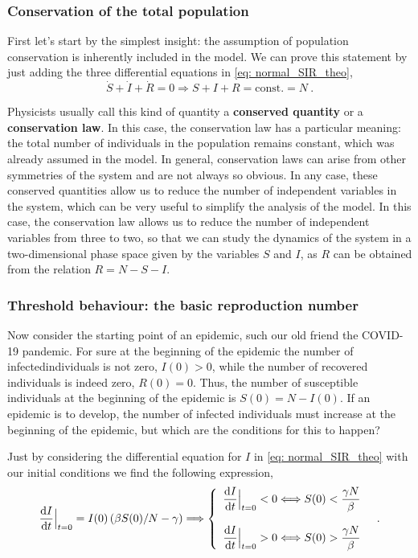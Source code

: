 \subsubsection*{Conservation of the total population}

First let's start by the simplest insight: the assumption of population
conservation is inherently included in the model. We can prove this statement
by just adding the three differential equations in \cref{eq: normal_SIR_theo},
\begin{equation}
  \dot{S}+\dot{I}+\dot{R}=0\Longrightarrow S+I+R=\mathrm{const.}=N \ .
\end{equation}

Physicists usually call this kind of quantity a \textbf{conserved quantity}
or a \textbf{conservation law}. In this case, the conservation law has a
particular meaning: the total number of individuals in the population remains
constant, which was already assumed in the model. In general, conservation laws
can arise from other symmetries of the system and are not always so obvious. In
any case, these conserved quantities allow us to reduce the number of
independent variables in the system, which can be very useful to simplify the
analysis of the model. In this case, the conservation law allows us to reduce
the number of independent variables from three to two, so that we can study the
dynamics of the system in a two-dimensional phase space given by the variables
$S$ and $I$, as $R$ can be obtained from the relation $R=N-S-I$.

\subsubsection*{Threshold behaviour: the basic reproduction number}

Now consider the starting point of an epidemic, such our old friend the
COVID-19 pandemic. For sure at the beginning of the epidemic the number of
infectedindividuals is not zero, $I(0)>0$, while the number of recovered
individuals is indeed zero, $R(0)=0$. Thus, the number of susceptible
individuals at the beginning of the epidemic is $S(0)=N-I(0)$. If an epidemic
is to develop, the number of infected individuals must increase at the
beginning of the epidemic, but which are the conditions for this to happen?

Just by considering the differential equation for $I$ in \cref{eq:
  normal_SIR_theo} with our initial conditions we find the following
expression,
\begin{equation}\label{eq: threshold}
  \frac{\mathrm{d} I}{\mathrm{d} t}\Big|_{t=0}^{}=I(0)\left(\beta
    S(0)/N-\gamma\right)\Longrightarrow\left\{\begin{array}{l}
    \displaystyle\frac{\mathrm{d} I}{\mathrm{d} t}\Big|_{t=0}^{}<0 \Longleftrightarrow
    S(0)<\frac{\gamma N}{\beta} \\\\
    \displaystyle\frac{\mathrm{d} I}{\mathrm{d} t}\Big|_{t=0}^{}>0 \Longleftrightarrow
    S(0)>\frac{\gamma N}{\beta}
  \end{array}\right. \ \ .
\end{equation}

